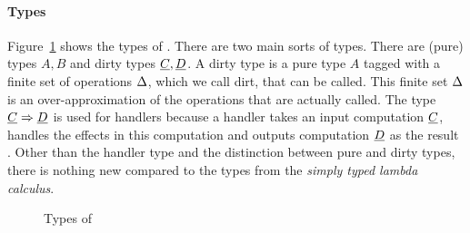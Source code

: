 \paragraph{Types}
Figure~\ref{fig:types:eff} shows the types of \eff. There are two main sorts of types. There are (pure) types $A, B$ and dirty types $\underline{C}, \underline{D}$. A dirty type is a pure type $A$ tagged with a finite set of operations $\Delta$, which we call dirt, that can be called. This finite set $\Delta$ is an over-approximation of the operations that are actually called. The type $\underline{C} \Rightarrow \underline{D}$ is used for handlers because a handler takes an input computation $\underline{C}$, handles the effects in this computation and outputs computation $\underline{D}$ as the result \cite{handling}. Other than the handler type and the distinction between pure and dirty types, there is nothing new compared to the types from the \textit{simply typed lambda calculus}.

\begin{figure}[!htb]
\begin{center}
\end{center}
\caption{Types of \eff}\label{fig:types:eff}
\end{figure}
